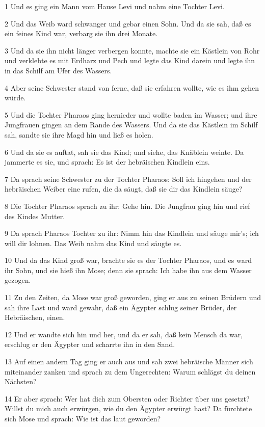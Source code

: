 \par 1 Und es ging ein Mann vom Hause Levi und nahm eine Tochter Levi.
\par 2 Und das Weib ward schwanger und gebar einen Sohn. Und da sie sah, daß es ein feines Kind war, verbarg sie ihn drei Monate.
\par 3 Und da sie ihn nicht länger verbergen konnte, machte sie ein Kästlein von Rohr und verklebte es mit Erdharz und Pech und legte das Kind darein und legte ihn in das Schilf am Ufer des Wassers.
\par 4 Aber seine Schwester stand von ferne, daß sie erfahren wollte, wie es ihm gehen würde.
\par 5 Und die Tochter Pharaos ging hernieder und wollte baden im Wasser; und ihre Jungfrauen gingen an dem Rande des Wassers. Und da sie das Kästlein im Schilf sah, sandte sie ihre Magd hin und ließ es holen.
\par 6 Und da sie es auftat, sah sie das Kind; und siehe, das Knäblein weinte. Da jammerte es sie, und sprach: Es ist der hebräischen Kindlein eins.
\par 7 Da sprach seine Schwester zu der Tochter Pharaos: Soll ich hingehen und der hebräischen Weiber eine rufen, die da säugt, daß sie dir das Kindlein säuge?
\par 8 Die Tochter Pharaos sprach zu ihr: Gehe hin. Die Jungfrau ging hin und rief des Kindes Mutter.
\par 9 Da sprach Pharaos Tochter zu ihr: Nimm hin das Kindlein und säuge mir's; ich will dir lohnen. Das Weib nahm das Kind und säugte es.
\par 10 Und da das Kind groß war, brachte sie es der Tochter Pharaos, und es ward ihr Sohn, und sie hieß ihn Mose; denn sie sprach: Ich habe ihn aus dem Wasser gezogen.
\par 11 Zu den Zeiten, da Mose war groß geworden, ging er aus zu seinen Brüdern und sah ihre Last und ward gewahr, daß ein Ägypter schlug seiner Brüder, der Hebräischen, einen.
\par 12 Und er wandte sich hin und her, und da er sah, daß kein Mensch da war, erschlug er den Ägypter und scharrte ihn in den Sand.
\par 13 Auf einen andern Tag ging er auch aus und sah zwei hebräische Männer sich miteinander zanken und sprach zu dem Ungerechten: Warum schlägst du deinen Nächsten?
\par 14 Er aber sprach: Wer hat dich zum Obersten oder Richter über uns gesetzt? Willst du mich auch erwürgen, wie du den Ägypter erwürgt hast? Da fürchtete sich Mose und sprach: Wie ist das laut geworden?
